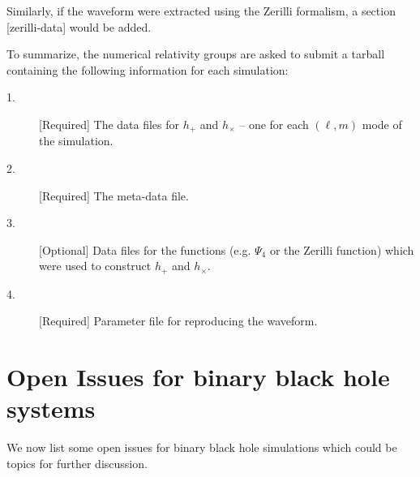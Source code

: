 \documentclass[10pt]{ligodcc}
\renewcommand{\texttt}[1]{{\ttfamily\color{blue}#1}}
\begin{document}
Similarly, if the waveform were extracted using the Zerilli formalism, a
section \texttt{[zerilli-data]} would be added.

To summarize, the numerical relativity groups are asked to submit a
tarball containing the following information for each simulation:
\begin{description}
\item[1.][Required] The data files for $h_+$ and $h_\times$ -- one for
  each $(\ell,m)$ mode of the simulation.
\item[2.][Required] The meta-data file.
\item[3.][Optional] Data files for the functions (e.g. $\Psi_4$ or the
  Zerilli function) which were used to construct $h_{+}$ and $h_{\times}$.
\item[4.][Required] Parameter file for reproducing the waveform.
\end{description}




\section{Open Issues for binary black hole systems}
\label{sec:openissues}

We now list some open issues for binary black hole simulations which
could be topics for further discussion.
\end{document}
